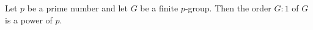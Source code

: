 Let $p$ be a prime number and let $G$ be a finite $p$-group. Then the order $G:1$ of $G$ is a power of $p$.
